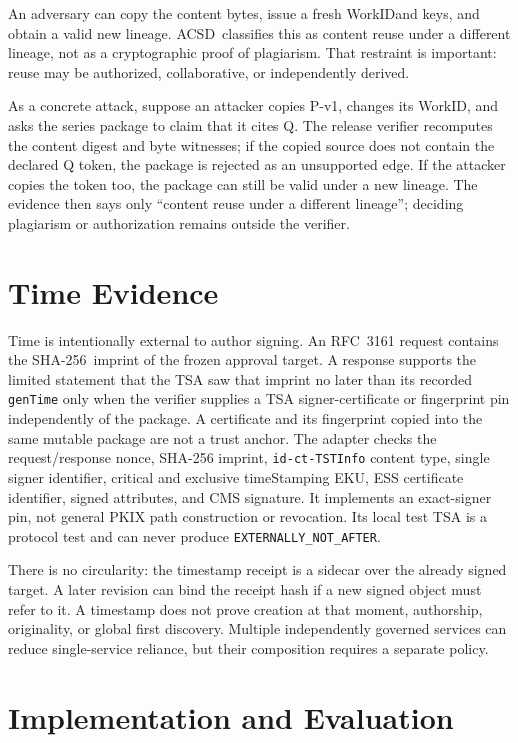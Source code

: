 \documentclass[11pt]{article}
\newcommand{\workid}{\textsf{WorkID}}
\newcommand{\acsd}{\textsc{ACSD}}
\newcommand{\sha}{\textsf{SHA-256}}
\begin{document}
An adversary can copy the content bytes, issue a fresh \workid and keys, and obtain a valid new lineage. \acsd\ classifies this as content reuse under a different lineage, not as a cryptographic proof of plagiarism. That restraint is important: reuse may be authorized, collaborative, or independently derived.

As a concrete attack, suppose an attacker copies P-v1, changes its WorkID,
and asks the series package to claim that it cites Q. The release verifier
recomputes the content digest and byte witnesses; if the copied source does not
contain the declared Q token, the package is rejected as an unsupported edge.
If the attacker copies the token too, the package can still be valid under a
new lineage. The evidence then says only “content reuse under a different
lineage”; deciding plagiarism or authorization remains outside the verifier.

\section{Time Evidence}

Time is intentionally external to author signing. An RFC~3161 request contains
the \sha\ imprint of the frozen approval target. A response supports the limited
statement that the TSA saw that imprint no later than its recorded
\texttt{genTime} only when the verifier supplies a TSA signer-certificate or
fingerprint pin independently of the package. A certificate and its fingerprint
copied into the same mutable package are not a trust anchor. The adapter checks
the request/response nonce, SHA-256 imprint, \texttt{id-ct-TSTInfo} content type,
single signer identifier, critical and exclusive timeStamping EKU, ESS
certificate identifier, signed attributes, and CMS signature. It implements an
exact-signer pin, not general PKIX path construction or revocation. Its local
test TSA is a protocol test and can never produce
\texttt{EXTERNALLY\_NOT\_AFTER}.

There is no circularity: the timestamp receipt is a sidecar over the already
signed target. A later revision can bind the receipt hash if a new signed object
must refer to it. A timestamp does not prove creation at that moment,
authorship, originality, or global first discovery. Multiple independently
governed services can reduce single-service reliance, but their composition
requires a separate policy.

\section{Implementation and Evaluation}
\end{document}
